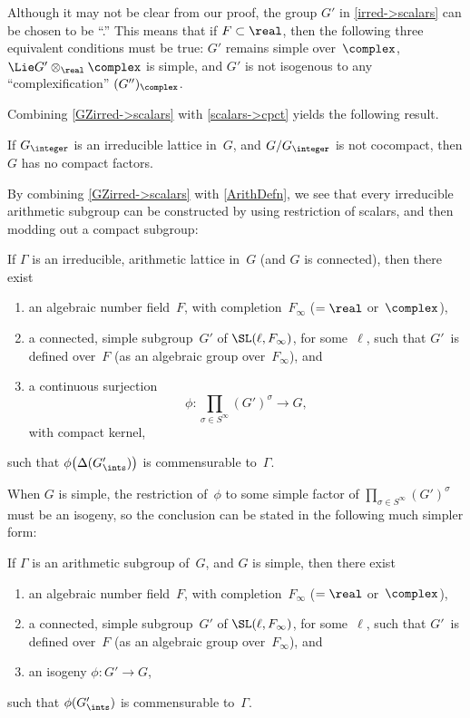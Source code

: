 \begin{rem} \label{ROSAbsSimple}
Although it may not be clear from our proof, the group $G'$ in \cref{irred->scalars} can be chosen to be ``\zz.'' This means that if $F \subset \real$, then the following three equivalent conditions must be true: $G'$ remains simple over~$\complex$, $\Lie G' \otimes_\real \complex$ is simple, and $G'$ is not isogenous to any ``complexification'' $(G'')_\complex$.
\end{rem}

Combining \cref{GZirred->scalars} with
\cref{scalars->cpct} yields the following result.

\begin{cor} \label{noncocpct->nocpct}
 If $G_{\integer}$ is an irreducible lattice in~$G$, and
$G/G_{\integer}$ is not cocompact, then $G$ has no compact
factors.
 \end{cor}

By combining \cref{GZirred->scalars} with \cref{ArithDefn}, we see that every irreducible arithmetic subgroup can be constructed by using restriction of scalars, and then modding out a compact subgroup:

\begin{cor} \label{irred->scalars}
 If\/ $\Gamma$ is an irreducible, arithmetic lattice in~$G$ \textup(and $G$ is connected\/\textup), then there exist
 \begin{enumerate}
 \item an algebraic number field~$F$, with
completion~$F_\infty$ \textup($= \real$
or~$\complex$\textup),
 \item a connected, simple subgroup~$G'$ of\/
$\SL(\ell,F_{\infty})$, for some~$\ell$,  such that $G'$~is
defined over~$F$ \textup(as an algebraic group
over~$F_{\infty}$\textup), and
 \item a continuous surjection 
 $$\phi \colon \prod_{\sigma \in S^\infty} (G')^\sigma \to G ,$$
 with compact kernel,
 \end{enumerate}
 such that 
 $\phi \bigl( \Delta(G'_{\ints}) \bigr)$
 is commensurable to~$\Gamma$.
 \end{cor}
 
 When $G$ is simple, the restriction of~$\phi$ to some simple factor of $\prod_{\sigma \in S^\infty} (G')^\sigma$ must be an isogeny, so the conclusion can be stated in the following much simpler form:

\begin{cor} \label{simple->Arith=Ints}
 If\/ $\Gamma$ is an arithmetic subgroup of~$G$, and $G$ is simple, then there exist
 \begin{enumerate}
 \item an algebraic number field~$F$, with
completion~$F_\infty$ \textup($= \real$
or~$\complex$\textup),
 \item a connected, simple subgroup~$G'$ of\/
$\SL(\ell,F_{\infty})$, for some~$\ell$,  such that $G'$~is
defined over~$F$ \textup(as an algebraic group
over~$F_{\infty}$\textup), and
 \item an isogeny
 $\phi \colon G' \to G$,
 \end{enumerate}
 such that 
 $\phi( G'_{\ints})$
 is commensurable to~$\Gamma$.
 \end{cor}

